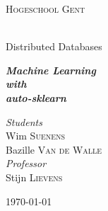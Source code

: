 \documentclass[12pt]{DistributedDatabases}[2021/12/09]
\begin{document}
\frontmatter %

\begin{titlepage}
\begin{center}

\vspace*{.06\textheight}
{\scshape\LARGE{Hogeschool Gent}}
\vspace{1.5cm}

\HRule \\[0.8cm] %
{\huge{Distributed Databases}}\vspace{0.4cm}
\HRule \\[1.5cm] %

\vfill

\large \textit{\textbf{Machine Learning}}\\[0.4cm]
\textit{\textbf{with}}\\[0.4cm]
\textit{\textbf{auto-sklearn}}\\[0.4cm]
  
\vfill

\begin{flushright} \large
  \emph{Students}\\
  Wim \textsc{Suenens} \\
  Bazille \textsc{Van de Walle} \\
  \vspace{1.0cm}
  \emph{Professor}\\
  Stijn \textsc{Lievens}
\end{flushright}

\vfill

{\large \today}\\[2cm]
  
\vfill
\end{center}
\end{titlepage}

\tableofcontents

\mainmatter %
\setcounter{page}{1}




\end{document}
